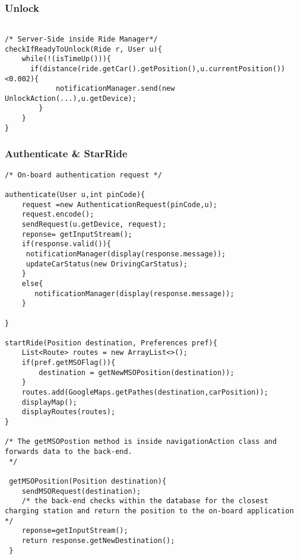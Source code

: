 \subsubsection{Unlock}
\begin{lstlisting}

/* Server-Side inside Ride Manager*/
checkIfReadyToUnlock(Ride r, User u){
	while(!(isTimeUp())){
	  if(distance(ride.getCar().getPosition(),u.currentPosition())<0.002){
			notificationManager.send(new UnlockAction(...),u.getDevice);
		}
	}
}
\end{lstlisting}


\subsubsection{Authenticate \& StarRide}
\begin{lstlisting}
/* On-board authentication request */

authenticate(User u,int pinCode){
	request =new AuthenticationRequest(pinCode,u);
	request.encode();
	sendRequest(u.getDevice, request);
	reponse= getInputStream();
	if(response.valid()){
	 notificationManager(display(response.message));	
	 updateCarStatus(new DrivingCarStatus);
	}
	else{
	   notificationManager(display(response.message));
	}
	
}

startRide(Position destination, Preferences pref){
	List<Route> routes = new ArrayList<>();
	if(pref.getMSOFlag()){
		destination = getNewMSOPosition(destination));	
	}	
	routes.add(GoogleMaps.getPathes(destination,carPosition));
	displayMap();
	displayRoutes(routes);
}

/* The getMSOPostion method is inside navigationAction class and forwards data to the back-end.
 */
 
 getMSOPosition(Position destination){
	sendMSORequest(destination);
	/* the back-end checks within the database for the closest charging station and return the position to the on-board application */
	reponse=getInputStream();
	return response.getNewDestination(); 
 }

\end{lstlisting}

